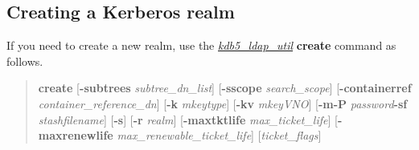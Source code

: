 \documentclass[letterpaper,10pt,english]{sphinxmanual}
\begin{document}
\subsection{Creating a Kerberos realm}
\label{admin/database:creating-a-kerberos-realm}\label{admin/database:ldap-create-realm}
If you need to create a new realm, use the {\hyperref[admin/admin_commands/kdb5_ldap_util:kdb5-ldap-util-8]{\emph{kdb5\_ldap\_util}}}
\textbf{create} command as follows.
\begin{quote}

\textbf{create}
{[}\textbf{-subtrees} \emph{subtree\_dn\_list}{]}
{[}\textbf{-sscope} \emph{search\_scope}{]}
{[}\textbf{-containerref} \emph{container\_reference\_dn}{]}
{[}\textbf{-k} \emph{mkeytype}{]}
{[}\textbf{-kv} \emph{mkeyVNO}{]}
{[}\textbf{-m\textbar{}-P} \emph{password}\textbar{}\textbf{-sf} \emph{stashfilename}{]}
{[}\textbf{-s}{]}
{[}\textbf{-r} \emph{realm}{]}
{[}\textbf{-maxtktlife} \emph{max\_ticket\_life}{]}
{[}\textbf{-maxrenewlife} \emph{max\_renewable\_ticket\_life}{]}
{[}\emph{ticket\_flags}{]}
\end{quote}
\end{document}
